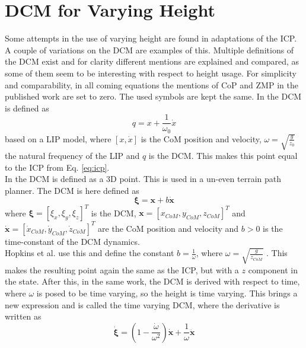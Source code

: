 \section{\ac{DCM} for Varying Height}
Some attempts in the use of varying height are found in adaptations of the \ac{ICP}. A couple of variations on the \acf{DCM} are examples of this. Multiple definitions of the \ac{DCM} exist and for clarity different mentions are explained and compared, as some of them seem to be interesting with respect to height usage. For simplicity and comparability, in all coming equations the mentions of \ac{CoP} and \ac{ZMP} in the published work are set to zero. The used symbols are kept the same. In \cite{takenaka2009real} the \ac{DCM} is defined as 
\begin{equation}
q = x + \frac{1}{\omega_0}\dot{x}
\label{eq:takenakadcm}
\end{equation} 
based on a \ac{LIP} model, where $[x,\dot{x}]$ is the \ac{CoM} position and velocity, $\omega=\sqrt{\frac{g}{z_0}}$ the natural frequency of the \ac{LIP} and $q$ is the \ac{DCM}. This makes this point equal to the \ac{ICP} from Eq. \eqref{eq:icp}. \\
In \cite{englsberger2013three} the \ac{DCM} is defined as a \ac{3D} point. This is used in a un-even terrain path planner. The \ac{DCM} is here defined as
\begin{equation}
\boldsymbol{\xi} = \boldsymbol{x} + b\boldsymbol{\dot{x}}
\label{eq:englsdcm}
\end{equation}
where $\boldsymbol{\xi}=[\xi_x,\xi_y,\xi_z]^T$ is the \ac{DCM}, $\boldsymbol{x}=[x_{CoM}, y_{CoM}, z_{CoM}]^T$ and $\boldsymbol{\dot{x}}=[\dot{x}_{CoM}, \dot{y}_{CoM}, \dot{z}_{CoM}]^T$ are the \ac{CoM} position and velocity and $b>0$ is the time-constant of the \ac{DCM} dynamics. \\
Hopkins et al. use this and define the constant $b=\frac{1}{\omega}$, where $\omega=\sqrt{\frac{g}{z_{CoM}}}$ \cite{hopkins2014humanoid}. This makes the resulting point again the same as the \ac{ICP}, but with a $z$ component in the state. After this, in the same work, the \ac{DCM} is derived with respect to time, where $\omega$ is posed to be time varying, so the height is time varying. This brings a new expression and is called the time varying \ac{DCM}, where the derivative is written as
\begin{equation}
\boldsymbol{\dot{\xi}}=(1-\frac{\dot{\omega}}{\omega^2})\boldsymbol{\dot{x}}+\frac{1}{\omega}\boldsymbol{\ddot{x}}
\end{equation}
